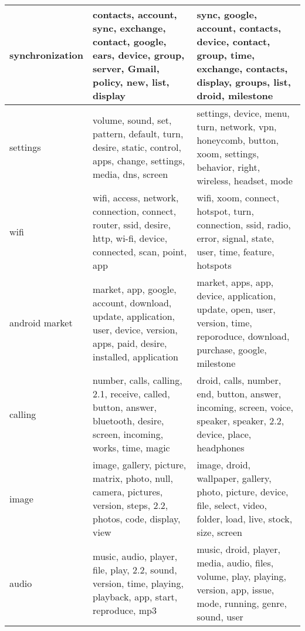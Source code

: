 \begin{table*}[!htb]
\begin{tabular}{|m{1.75cm}<{\centering}||m{7.33cm}<{\centering}||m{7.33cm}<{\centering}|}
synchronization
&
contacts,  account,  sync,  exchange,  contact,  
google,  ears,  device,  group,  server,  
Gmail,  policy,  new,  list,  display 
&
sync,  google,  account,  contacts,  device, 
contact,  group,  time,  exchange,  contacts, 
display,  groups,  list,  droid,  milestone
\\ \hline

settings
&
volume,  sound,  set,  pattern,  default,  
turn,  desire,  static,  control,  apps,  
change,  settings,  media,  dns,  screen 
&

settings,  device,  menu,  turn,  network, 
vpn,  honeycomb,  button,  xoom,  settings, 
behavior,  right,  wireless,  headset,  mode
\\ \hline

wifi
&
wifi,  access,  network,  connection,  connect,  
  router,  ssid,  desire,  http,  wi-fi,  
    device,  connected,  scan,  point,  app 
&
wifi,  xoom,  connect,  hotspot,  turn, 
 connection,  ssid,  radio,  error, signal, 
state,  user,  time,  feature, hotspots
\\ \hline

android market
&
market,  app,  google,  account,  download,  
update,  application,  user,  device,  version,  
apps,  paid,  desire,  installed,  application 
&
market,  apps,  app,  device,  application, 
update,  open,  user,  version,  time, 
reporoduce,  download,  purchase,  google,  milestone
\\ \hline

calling
&
number,  calls,  calling,  2.1,  receive,  
called,  button,  answer,  bluetooth,  desire,  
screen,  incoming,  works,  time,  magic 
&
droid,  calls,  number,  end,  button, 
answer,  incoming,  screen,  voice,  speaker, 
speaker,  2.2,  device,  place,  headphones
\\ \hline

image
&
image,  gallery,  picture,  matrix,  photo,  
null,  camera,  pictures,  version,  steps,  
2.2,  photos,  code,  display,  view 
&
image,  droid,  wallpaper,  gallery,  photo, 
picture,  device,  file,  select, video, 
 folder,  load,  live,  stock,  size,  screen
\\ \hline

audio
&
music,  audio,  player,  file,  play,  
  2.2, sound,  version,  time,  playing,  
  playback,  app,  start,  reproduce,  mp3 
&
music,  droid,  player,  media,  audio, 
files,  volume,  play,  playing,  version, 
 app,  issue,  mode,  running,  genre,  sound,  user
\\ \hline


\end{tabular}
\end{table*}
